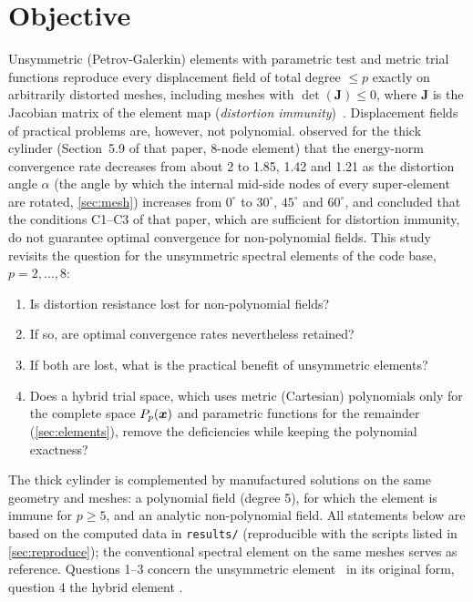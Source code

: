 \section{Objective}\label{sec:intro}
Unsymmetric (Petrov-Galerkin) elements with parametric test and metric trial
functions reproduce every displacement field of total degree $\le p$ exactly on
arbitrarily distorted meshes, including meshes with $\det(\bm J)\le0$, where $\bm J$ is the
Jacobian matrix of the element map (\emph{distortion immunity})~\cite{Rajendran2003novel,Rajendran2010technique}.
Displacement fields of practical problems are, however, not polynomial.
 observed for the thick cylinder (Section~5.9 of that
paper, 8-node element) that the energy-norm convergence rate decreases from about
2 to 1.85, 1.42 and 1.21 as the distortion angle $\alpha$ (the angle by which the
internal mid-side nodes of every super-element are rotated, \cref{sec:mesh}) increases
from $0^\circ$ to $30^\circ$, $45^\circ$ and $60^\circ$, and concluded that the conditions C1--C3 of that paper, which are sufficient for
distortion immunity, do not guarantee optimal convergence for non-polynomial fields. This study revisits the
question for the unsymmetric spectral elements of the code base, $p=2,\dots,8$:
\begin{enumerate}
\item Is distortion resistance lost for non-polynomial fields?
\item If so, are optimal convergence rates nevertheless retained?
\item If both are lost, what is the practical benefit of unsymmetric elements?
\item Does a hybrid trial space, which uses metric (Cartesian) polynomials only for the
  complete space $P_p(\bm{x})$ and parametric functions for the remainder
  (\cref{sec:elements}), remove the deficiencies while keeping the polynomial exactness?
\end{enumerate}
The thick cylinder is complemented by manufactured solutions on the same geometry
and meshes: a polynomial field (degree 5), for which the element is immune for
$p\ge5$, and an analytic non-polynomial field. All statements below are based on the
computed data in \texttt{results/} (reproducible with the scripts listed in
\cref{sec:reproduce}); the conventional spectral element on the same meshes serves
as reference. Questions 1--3 concern the unsymmetric element \PM\ in its original form,
question 4 the hybrid element \PH.
